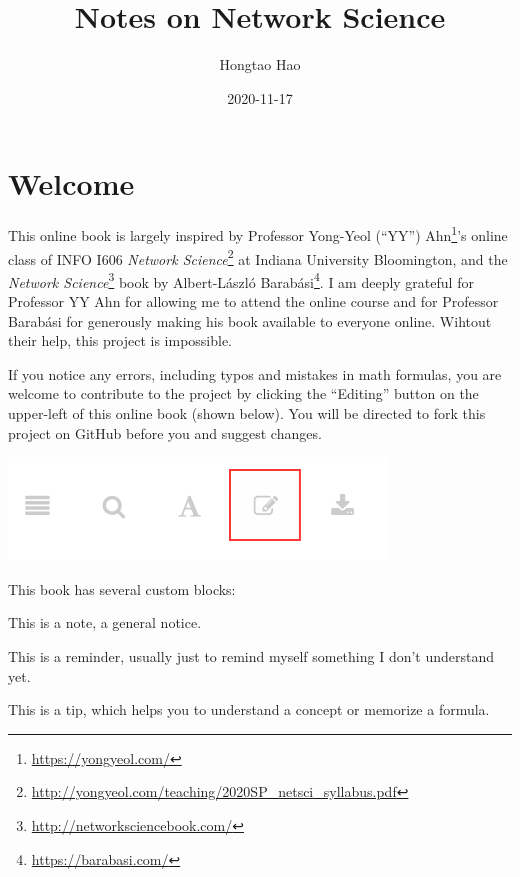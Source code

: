 \documentclass[
]{krantz}
\title{Notes on Network Science}
\author{Hongtao Hao}
\date{2020-11-17}
\makeatletter
\renewcommand{\href}[2]{#2\footnote{\url{#1}}}
\newenvironment{kframe}{%
\medskip{}
\setlength{\fboxsep}{.8em}
 \def\at@end@of@kframe{}%
 \ifinner\ifhmode%
  \def\at@end@of@kframe{\end{minipage}}%
  \begin{minipage}{\columnwidth}%
 \fi\fi%
 \def\FrameCommand##1{\hskip\@totalleftmargin \hskip-\fboxsep
 \colorbox{shadecolor}{##1}\hskip-\fboxsep
     \hskip-\linewidth \hskip-\@totalleftmargin \hskip\columnwidth}%
 \MakeFramed {\advance\hsize-\width
   \@totalleftmargin\z@ \linewidth\hsize
   \@setminipage}}%
 {\par\unskip\endMakeFramed%
 \at@end@of@kframe}
\newenvironment{rmdblock}[1]
  {
  \begin{itemize}
  \renewcommand{\labelitemi}{
    \raisebox{-.7\height}[0pt][0pt]{
      {\setkeys{Gin}{width=3em,keepaspectratio}\texttt{[image: images/\#1]}}
    }
  }
  \setlength{\fboxsep}{1em}
  \begin{kframe}
  \item
  }
  {
  \end{kframe}
  \end{itemize}
  }
\newenvironment{rmdnote}
  {\begin{rmdblock}{note}}
  {\end{rmdblock}}
\newenvironment{rmdtip}
  {\begin{rmdblock}{tip}}
  {\end{rmdblock}}
\newenvironment{rmdreminder}
  {\begin{rmdblock}{reminder}}
  {\end{rmdblock}}
\makeatother
\begin{document}
\maketitle

{
\hypersetup{linkcolor=}
\setcounter{tocdepth}{2}
\tableofcontents
}
\listoftables
\listoffigures
\hypertarget{welcome}{%
\chapter*{Welcome}\label{welcome}}


This online book is largely inspired by Professor \href{https://yongyeol.com/}{Yong-Yeol (``YY'') Ahn}'s online class of \href{http://yongyeol.com/teaching/2020SP_netsci_syllabus.pdf}{INFO I606 \emph{Network Science}} at Indiana University Bloomington, and the \href{http://networksciencebook.com/}{\emph{Network Science}} book by \href{https://barabasi.com/}{Albert-László Barabási}. I am deeply grateful for Professor YY Ahn for allowing me to attend the online course and for Professor Barabási for generously making his book available to everyone online. Wihtout their help, this project is impossible.

If you notice any errors, including typos and mistakes in math formulas, you are welcome to contribute to the project by clicking the ``Editing'' button on the upper-left of this online book (shown below). You will be directed to fork this project on GitHub before you and suggest changes.

\begin{center}\includegraphics[width=0.45\linewidth]{images/edit} \end{center}

This book has several custom blocks:

\begin{rmdnote}
This is a note, a general notice.
\end{rmdnote}

\begin{rmdreminder}
This is a reminder, usually just to remind myself something I don't understand yet.
\end{rmdreminder}

\begin{rmdtip}
This is a tip, which helps you to understand a concept or memorize a formula.
\end{rmdtip}
\end{document}
